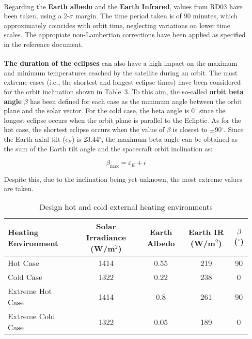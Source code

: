 \paragraph{}

Regarding the \textbf{Earth albedo} and the \textbf{Earth Infrared}, values from RD03 have been taken, using a 2-$\sigma$ margin. The time
period taken is of 90 minutes, which approximately coincides with orbit time, neglecting variations on lower time scales. The appropiate 
non-Lambertian corrections have been applied as specified in the reference document.

\paragraph{}

\textbf{The duration of the eclipses} can also have a high impact on the maximum and minimum temperatures reached by 
the satellite during an orbit. The most extreme cases (i.e., the shortest and longest eclipse times) have been 
considered for the orbit inclination shown in Table~3. To this aim, the so-called \textbf{orbit beta angle} $\beta$ 
has been defined for each case as the minimum angle between the orbit plane and the solar vector. For the cold case,
the beta angle is 0$^\circ$ since the longest eclipse occurs when the orbit plane is parallel to the Ecliptic. As for
the hot case, the shortest eclipse occurs when the value of $\beta$ is closest to $\pm$90$^\circ$. Since the Earth 
axial tilt ($\epsilon_E$) is 23.44$^\circ$, the maximum beta angle can be obtained as the sum of the Earth tilt angle 
and the spacecraft orbit inclination as:

\begin{equation}
    \beta_{\text{max}} = \varepsilon_E + i
\end{equation}

Despite this, due to the inclination being yet unknown, the most extreme values are taken.

\begin{table}[H]
    \centering
    \begin{tabular}{lcccc}
        \toprule
        \textbf{Heating Environment} & \textbf{Solar Irradiance (W/m$^2$)} & \textbf{Earth Albedo} & \textbf{Earth IR (W/m$^2$)} & \textbf{$\beta$ ($^\circ$)} \\
        \midrule
        Hot Case             & 1414 & 0.55  & 219 & 90 \\
        Cold Case            & 1322 & 0.22  & 238 & 0     \\
        Extreme Hot Case   & 1414 & 0.8 & 261 & 90 \\
        Extreme Cold Case  & 1322 & 0.05 & 189 & 0 \\
        \bottomrule
    \end{tabular}
    \caption{Design hot and cold external heating environments}
    \label{tab:heating_environments}
\end{table}

